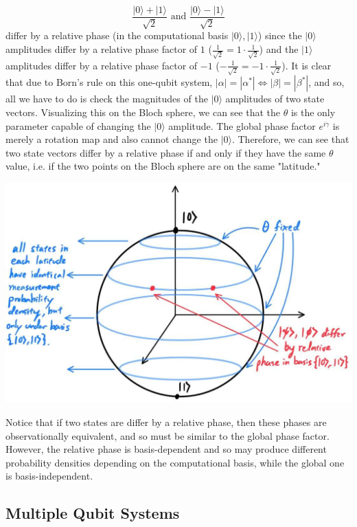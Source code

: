 \documentclass{article}
\theoremstyle{definition}
\begin{document}
    \[\frac{|0\rangle + |1\rangle}{\sqrt{2}} \text{ and } \frac{|0\rangle - |1\rangle}{\sqrt{2}}\]
    differ by a relative phase (in the computational basis $|0\rangle, |1\rangle$) since the $|0\rangle$ amplitudes differ by a relative phase factor of $1$ ($ \frac{1}{\sqrt{2}} = 1 \cdot \frac{1}{\sqrt{2}}$) and the $|1\rangle$ amplitudes differ by a relative phase factor of $-1$ ($-\frac{1}{\sqrt{2}} = -1 \cdot \frac{1}{\sqrt{2}}$). It is clear that due to Born's rule on this one-qubit system, $|\alpha| = |\alpha^*| \iff |\beta| = |\beta^*|$, and so, all we have to do is check the magnitudes of the $|0\rangle$ amplitudes of two state vectors. Visualizing this on the Bloch sphere, we can see that the $\theta$ is the only parameter capable of changing the $|0\rangle$ amplitude. The global phase factor $e^{i\gamma}$ is merely a rotation map and also cannot change the $|0\rangle$. Therefore, we can see that two state vectors differ by a relative phase if and only if they have the same $\theta$ value, i.e. if the two points on the Bloch sphere are on the same "latitude."

    \begin{center} 
      \includegraphics[scale=0.3]{img/Bloch_Sphere_latitude.jpg}
    \end{center}

    Notice that if two states are differ by a relative phase, then these phases are observationally equivalent, and so must be similar to the global phase factor. However, the relative phase is basis-dependent and so may produce different probability densities depending on the computational basis, while the global one is basis-independent. 

  \subsection{Multiple Qubit Systems}
\end{document}
